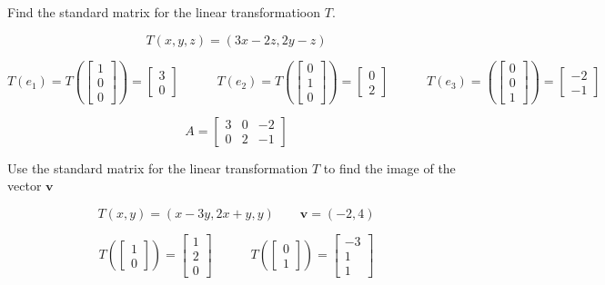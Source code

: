 \documentclass{report}
\begin{document}
\begin{tcolorbox}[colframe = lightred]
	Find the standard matrix for the linear transformatioon $T$.
	
	$$
	T(x,y,z) = (3x-2z, 2y-z)
	$$
\end{tcolorbox}

$$
T(e_1)  = T \left( \begin{bmatrix} 1 \\ 0 \\ 0 \end{bmatrix} \right) = \begin{bmatrix} 3 \\ 0 \end{bmatrix} \quad \quad \quad T(e_2) = T\left( \begin{bmatrix} 0 \\1 \\ 0 \end{bmatrix} \right) = \begin{bmatrix} 0 \\ 2 \end{bmatrix} \quad \quad \quad T(e_3)  = \left( \begin{bmatrix} 0 \\ 0 \\ 1 \end{bmatrix} \right) = \begin{bmatrix} -2 \\ -1 \end{bmatrix} 
$$

$$
\boxed{A = \begin{bmatrix} 3 & 0 & -2 \\ 0 & 2 & -1 \end{bmatrix}}
$$

\begin{tcolorbox}[colframe = lightred]
	Use the standard matrix for the linear transformation $T$ to find the image of the vector $\bm{v}$
	
	$$
	T(x,y) = (x-3y,2x+y,y) \quad \quad \bm{v} = (-2,4)
	$$
\end{tcolorbox}

$$
T\left( \begin{bmatrix} 1 \\ 0 \end{bmatrix}\right) = \begin{bmatrix}1 \\ 2 \\ 0 \end{bmatrix} \quad \quad \quad T\left( \begin{bmatrix} 0 \\ 1 \end{bmatrix}\right) = \begin{bmatrix} -3 \\ 1 \\ 1 \end{bmatrix} 
$$
\end{document}
